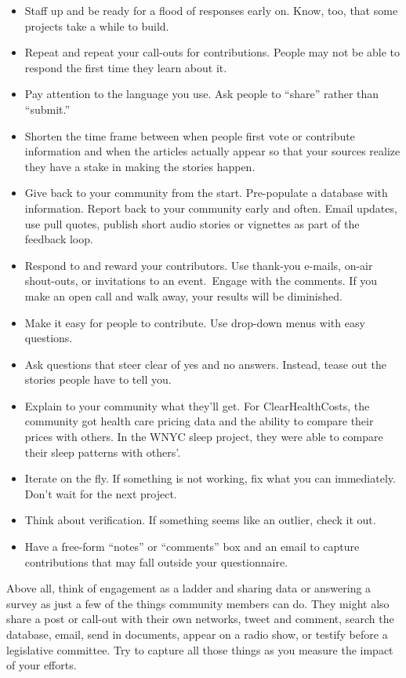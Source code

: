 \documentclass[notoc, symmetric, nobib, nols]{towcenter-guideto-book}
\begin{document}
\begin{itemize}
\item Staff up and be ready for a flood of responses early on. Know, too, that some projects take a while to build. 

\item Repeat and repeat your call-outs for contributions. People may not be able to respond the first time they learn about it.

\item Pay attention to the language you use. Ask people to ``share'' rather than ``submit.''

\item Shorten the time frame between when people first vote or contribute information and when the articles actually appear so that your sources realize they have a stake in making the stories happen.  

\item Give back to your community from the start. Pre-populate a database with information. Report back to your community early and often. Email updates, use pull quotes, publish short audio stories or vignettes as part of the feedback loop. 

\item Respond to and reward your contributors. Use thank-you e-mails, on-air shout-outs, or invitations to an event. Engage with the comments. If you make an open call and walk away, your results will be diminished. 

\item Make it easy for people to contribute. Use drop-down menus with easy questions. 

\item Ask questions that steer clear of yes and no answers. Instead, tease out the stories people have to tell you. 

\item Explain to your community what they'll get. For ClearHealthCosts, the community got health care pricing data and the ability to compare their prices with others. In the WNYC sleep project, they were able to compare their sleep patterns with others'. 

\item Iterate on the fly. If something is not working, fix what you can immediately. Don't wait for the next project. 

\item Think about verification. If something seems like an outlier, check it out. 

\item Have a free-form ``notes'' or ``comments'' box and an email to capture contributions that may fall outside your questionnaire.
\end{itemize}
Above all, think of engagement as a ladder and sharing data or answering a survey as just a few of the things community members can do. They might also share a post or call-out with their own networks, tweet and comment, search the database, email, send in documents, appear on a radio show, or testify before a legislative committee. Try to capture all those things as you measure the impact of your efforts.
\end{document}
